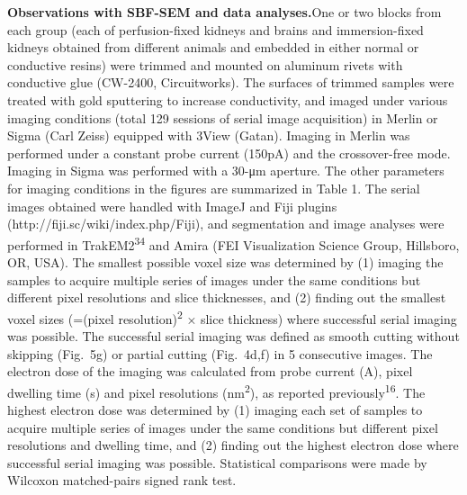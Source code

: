 \documentclass{article}
\begin{document}
\noindent\textbf{Observations with SBF-SEM and data analyses.}\quad One or two blocks from each group (each of perfusion-fixed kidneys and brains and immersion-fixed kidneys obtained from different animals and embedded in either normal or conductive resins) were trimmed and mounted on aluminum rivets with conductive glue (CW-2400, Circuitworks). The surfaces of trimmed samples were treated with gold sputtering to increase conductivity, and imaged under various imaging conditions (total 129 sessions of serial image acquisition) in Merlin or Sigma (Carl Zeiss) equipped with 3View (Gatan). Imaging in Merlin was performed under a constant probe current (150pA) and the crossover-free mode. Imaging in Sigma was performed with a 30-μm aperture. The other parameters for imaging conditions in the figures are summarized in Table 1. The serial images obtained were handled with ImageJ and Fiji plugins (http://fiji.sc/wiki/index.php/Fiji), and segmentation and image analyses were performed in TrakEM2\textsuperscript{34} and Amira (FEI Visualization Science Group, Hillsboro, OR, USA). The smallest possible voxel size was determined by (1) imaging the samples to acquire multiple series of images under the same conditions but different pixel resolutions and slice thicknesses, and (2) finding out the smallest voxel sizes (=(pixel resolution)\textsuperscript{2} × slice thickness) where successful serial imaging was possible. The successful serial imaging was defined as smooth cutting without skipping (Fig.~5g) or partial cutting (Fig.~4d,f) in 5 consecutive images. The electron dose of the imaging was calculated from probe current (A), pixel dwelling time (s) and pixel resolutions (nm\textsuperscript{2}), as reported previously\textsuperscript{16}. The highest electron dose was determined by (1) imaging each set of samples to acquire multiple series of images under the same conditions but different pixel resolutions and dwelling time, and (2) finding out the highest electron dose where successful serial imaging was possible. Statistical comparisons were made by Wilcoxon matched-pairs signed rank test.
\end{document}
